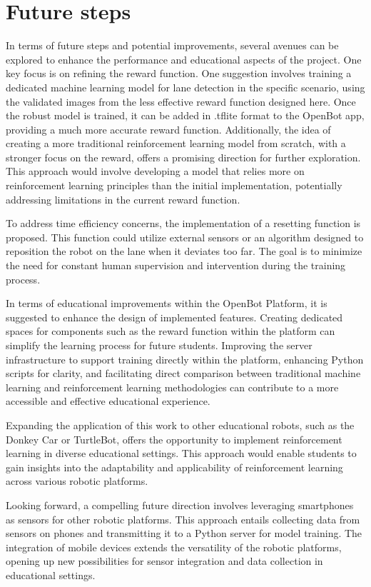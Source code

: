 \documentclass[12pt]{report}
\begin{document}
\section{Future steps}
\label{sub:future}

In terms of future steps and potential improvements, several avenues can be explored to enhance the performance and educational aspects of the project. One key focus is on refining the reward function. One suggestion involves training a dedicated machine learning model for lane detection in the specific scenario, using the validated images from the less effective reward function designed here. Once the robust model is trained, it can be added in .tflite format to the OpenBot app, providing a much more accurate reward function. Additionally, the idea of creating a more traditional reinforcement learning model from scratch, with a stronger focus on the reward, offers a promising direction for further exploration. This approach would involve developing a model that relies more on reinforcement learning principles than the initial implementation, potentially addressing limitations in the current reward function.

To address time efficiency concerns, the implementation of a resetting function is proposed. This function could utilize external sensors or an algorithm designed to reposition the robot on the lane when it deviates too far. The goal is to minimize the need for constant human supervision and intervention during the training process.

In terms of educational improvements within the OpenBot Platform, it is suggested to enhance the design of implemented features. Creating dedicated spaces for components such as the reward function within the platform can simplify the learning process for future students. Improving the server infrastructure to support training directly within the platform, enhancing Python scripts for clarity, and facilitating direct comparison between traditional machine learning and reinforcement learning methodologies can contribute to a more accessible and effective educational experience.

Expanding the application of this work to other educational robots, such as the Donkey Car or TurtleBot, offers the opportunity to implement reinforcement learning in diverse educational settings. This approach would enable students to gain insights into the adaptability and applicability of reinforcement learning across various robotic platforms.

Looking forward, a compelling future direction involves leveraging smartphones as sensors for other robotic platforms. This approach entails collecting data from sensors on phones and transmitting it to a Python server for model training. The integration of mobile devices extends the versatility of the robotic platforms, opening up new possibilities for sensor integration and data collection in educational settings.
\end{document}
